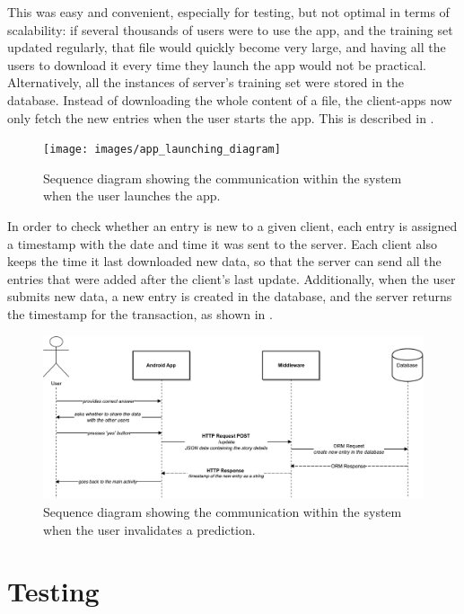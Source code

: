 \documentclass{mproj}
\begin{document}
This was easy and convenient, especially for testing, but not optimal in terms of scalability: if several thousands of users were to use the app, and the training set updated regularly, that file would quickly become very large, and having all the users to download it every time they launch the app would not be practical. Alternatively, all the instances of server's training set were stored in the database. Instead of downloading the whole content of a file, the client-apps now only fetch the new entries when the user starts the app. This is described in .

\begin{figure}[h]
	\centering
	\texttt{[image: images/app\_launching\_diagram]}
	\caption{Sequence diagram showing the communication within the system when the user launches the app.}
	\label{fig:launch}
\end{figure}

In order to check whether an entry is new to a given client, each entry is assigned a timestamp with the date and time it was sent to the server. Each client also keeps the time it last downloaded new data, so that the server can send all the entries that were added after the client's last update. Additionally, when the user submits new data, a new entry is created in the database, and the server returns the timestamp for the transaction, as shown in .

\begin{figure}[h]
	\centering
	\includegraphics[width=\textwidth]{images/wrong_prediction_diagram}
	\caption{Sequence diagram showing the communication within the system when the user invalidates a prediction.}
	\label{fig:new_entry}
\end{figure}


\section{Testing}
\end{document}
